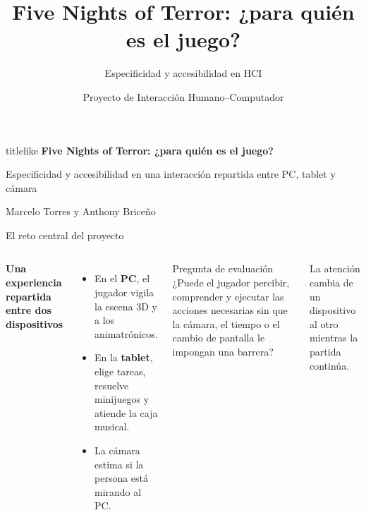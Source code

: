 \documentclass[aspectratio=169,11pt]{beamer}
\title{Five Nights of Terror: ¿para quién es el juego?}
\subtitle{Especificidad y accesibilidad en HCI}
\author{Proyecto de Interacción Humano--Computador}
\institute{Análisis del prototipo Unity + Flutter}
\date{}
\newcommand{\tagline}[1]{{\color{Teal}\bfseries\small #1}}
\newcommand{\smallnote}[1]{{\color{Muted}\scriptsize #1}}
\newcommand{\strong}[1]{{\color{Navy}\bfseries #1}}
\begin{document}
\begin{frame}[plain]
  \begin{beamercolorbox}[wd=\paperwidth,ht=\paperheight,sep=1.2cm,center]{titlelike}
    {\LARGE\bfseries Five Nights of Terror: ¿para quién es el juego?}\par\vspace{.55cm}
    {\large Especificidad y accesibilidad en una interacción repartida entre PC, tablet y cámara}\par\vspace{.8cm}
    {\large Marcelo Torres y Anthony Briceño}\par\vspace{1cm}
  \end{beamercolorbox}
\end{frame}

\begin{frame}{El reto central del proyecto}
  \begin{columns}[T,onlytextwidth]
      \tagline{Una experiencia repartida entre dos dispositivos}
      \vspace{.35em}
      \begin{itemize}
        \item En el \strong{PC}, el jugador vigila la escena 3D y a los animatrónicos.
        \item En la \strong{tablet}, elige tareas, resuelve minijuegos y atiende la caja musical.
        \item La cámara estima si la persona está mirando al PC.
      \end{itemize}
      \vspace{.15em}
      \begin{block}{Pregunta de evaluación}
        ¿Puede el jugador percibir, comprender y ejecutar las acciones necesarias sin que la cámara, el tiempo o el cambio de pantalla le impongan una barrera?
      \end{block}
      \centering
      \vspace{.35cm}
      \vspace{.4cm}
      \smallnote{La atención cambia de un dispositivo al otro mientras la partida continúa.}
  \end{columns}
\end{frame}
\end{document}
